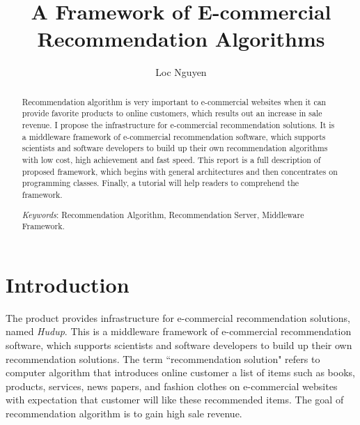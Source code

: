 \documentclass[a4paper]{llncs}
\begin{document}
\pagestyle{empty}

\mainmatter

\title{A Framework of E-commercial Recommendation Algorithms}


\author{Loc Nguyen}



\maketitle

\begin{abstract}
Recommendation algorithm is very important to e-commercial websites when it can provide favorite products to online customers, which results out an increase in sale revenue. I propose the infrastructure for e-commercial recommendation solutions. It is a middleware framework of e-commercial recommendation software, which supports scientists and software developers to build up their own recommendation algorithms with low cost, high achievement and fast speed. This report is a full description of proposed framework, which begins with general architectures and then concentrates on programming classes. Finally, a tutorial will help readers to comprehend the framework.

\textit{Keywords}: Recommendation Algorithm, Recommendation Server, Middleware Framework.
\end{abstract}

\section{Introduction}
\label{sec:introduction}
The product provides infrastructure for e-commercial recommendation solutions, named \textit{Hudup}. This is a middleware framework of e-commercial recommendation software, which supports scientists and software developers to build up their own recommendation solutions. The term ``recommendation solution" refers to computer algorithm that introduces online customer a list of items such as books, products, services, news papers, and fashion clothes on e-commercial websites with expectation that customer will like these recommended items. The goal of recommendation algorithm is to gain high sale revenue.
\end{document}
